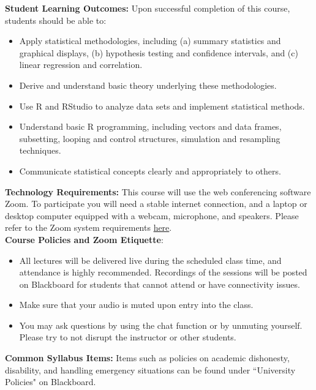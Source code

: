 \documentclass[12pt]{report}
\newenvironment{myitemize}
{ \begin{itemize}
    \setlength{\itemsep}{5pt}
    \setlength{\parskip}{0pt}
    \setlength{\parsep}{0pt}     }
{ \end{itemize}                  }
\begin{document}
\textbf{Student Learning Outcomes:}  Upon successful completion of this course, students should be able to:
\begin{myitemize}
\item Apply statistical methodologies, including (a) summary statistics and graphical displays, (b) hypothesis testing and confidence intervals, and (c) linear regression and correlation.
\item Derive and understand basic theory underlying these methodologies. 
\item Use R and RStudio to analyze data sets and implement statistical methods.
\item Understand basic R programming, including vectors and data frames, subsetting, looping and control structures, simulation and resampling techniques. 
\item Communicate statistical concepts clearly and appropriately to others.\\ 
\end{myitemize}
\clearpage

\textbf{Technology Requirements:}  This course will use the web conferencing software Zoom.  To participate you will need a stable internet connection,  and a laptop or desktop computer equipped with a webcam, microphone, and speakers.  Please refer to the Zoom system requirements \href{https://support.zoom.us/hc/en-us/articles/201362023-System-requirements-for-Windows-macOS-and-Linux}{here}.\\

\textbf{Course Policies and Zoom Etiquette}:
\begin{myitemize}
\item All lectures will be delivered live during the scheduled class time, and attendance is highly recommended.  Recordings of the sessions will be posted on Blackboard for students that cannot attend or have connectivity issues.   
\item Make sure that your audio is muted upon entry into the class.
\item You may ask questions by using the chat function or by unmuting yourself.  Please try to not disrupt the instructor or other students.\\
\end{myitemize}

\textbf{Common Syllabus Items:}  Items such as policies on academic dishonesty, disability, and handling emergency situations can be found under ``University Policies" on Blackboard.\\
\end{document}
